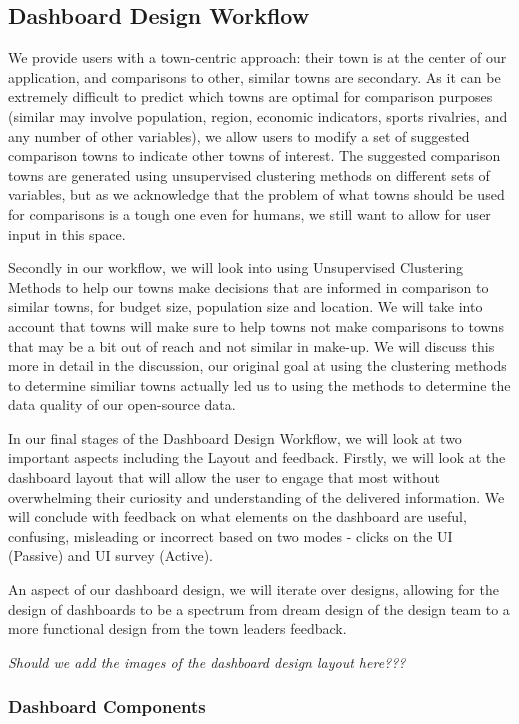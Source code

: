 \documentclass[letterpaper,inpress]{jdsart}
\begin{document}
\subsection{Dashboard Design Workflow}

We provide users with a town-centric approach: their town is at the center of our application, and comparisons to other, similar towns are secondary. As it can be extremely difficult to predict which towns are optimal for comparison purposes (similar may involve population, region, economic indicators, sports rivalries, and any number of other variables), we allow users to modify a set of suggested comparison towns to indicate other towns of interest. The suggested comparison towns are generated using unsupervised clustering methods on different sets of variables, but as we acknowledge that the problem of what towns should be used for comparisons is a tough one even for humans, we still want to allow for user input in this space.

Secondly in our workflow, we will look into using Unsupervised Clustering Methods to help our towns make decisions that are informed in comparison to similar towns, for budget size, population size and location. We will take into account that towns will make sure to help towns not make comparisons to towns that may be a bit out of reach and not similar in make-up. We will discuss this more in detail in the discussion, our original goal at using the clustering methods to determine similiar towns actually led us to using the methods to determine the data quality of our open-source data.

In our final stages of the Dashboard Design Workflow, we will look at two important aspects including the Layout and feedback. Firstly, we will look at the dashboard layout that will allow the user to engage that most without overwhelming their curiosity and understanding of the delivered information. We will conclude with feedback on what elements on the dashboard are useful, confusing, misleading or incorrect based on two modes - clicks on the UI (Passive) and UI survey (Active).

An aspect of our dashboard design, we will iterate over designs, allowing for the design of dashboards to be a spectrum from dream design of the design team to a more functional design from the town leaders feedback.

\textit{Should we add the images of the dashboard design layout here???}

\subsubsection{Dashboard Components}
\end{document}
